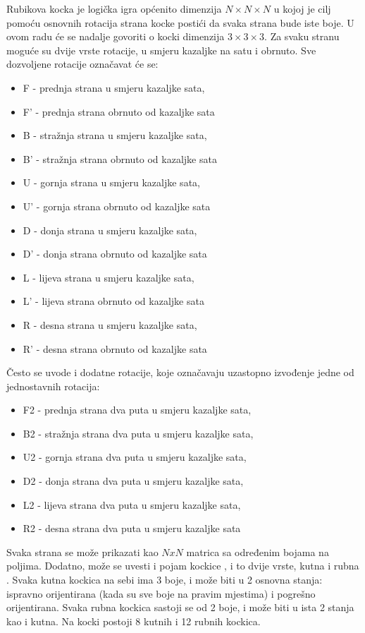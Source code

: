 \documentclass[times, utf8, seminar, numeric]{fer}
\begin{document}
Rubikova kocka je logička igra općenito dimenzija $N\times N\times N$ u kojoj je cilj pomoću osnovnih rotacija strana kocke postići da svaka strana bude iste boje. U ovom radu će se nadalje govoriti o kocki dimenzija $3\times3\times3$. Za svaku stranu moguće su dvije vrste rotacije, u smjeru kazaljke na satu i obrnuto. Sve dozvoljene rotacije označavat će se:

\begin{itemize}
\item F - prednja strana u smjeru kazaljke sata, 
\item F' - prednja strana obrnuto od kazaljke sata
\item B - stražnja strana u smjeru kazaljke sata, 
\item B' - stražnja strana obrnuto od kazaljke sata
\item U - gornja strana u smjeru kazaljke sata, 
\item U' - gornja strana obrnuto od kazaljke sata
\item D - donja strana u smjeru kazaljke sata, 
\item D' - donja strana obrnuto od kazaljke sata
\item L - lijeva strana u smjeru kazaljke sata, 
\item L' - lijeva strana obrnuto od kazaljke sata
\item R - desna strana u smjeru kazaljke sata, 
\item R' - desna strana obrnuto od kazaljke sata
\end{itemize}

Često se uvode i dodatne rotacije, koje označavaju uzastopno izvođenje jedne od jednostavnih rotacija:
\begin{itemize}
\item F2 - prednja strana dva puta u smjeru kazaljke sata, 
\item B2 - stražnja strana dva puta u smjeru kazaljke sata, 
\item U2 - gornja strana dva puta u smjeru kazaljke sata, 
\item D2 - donja strana dva puta u smjeru kazaljke sata, 
\item L2 - lijeva strana dva puta u smjeru kazaljke sata, 
\item R2 - desna strana dva puta u smjeru kazaljke sata
\end{itemize}

Svaka strana se može prikazati kao $NxN$ matrica sa određenim bojama na poljima. Dodatno, može se uvesti i pojam kockice , i to dvije vrste, kutna  i rubna . Svaka kutna kockica na sebi ima 3 boje, i može biti u 2 osnovna stanja: ispravno orijentirana (kada su sve boje na pravim mjestima) i pogrešno orijentirana. Svaka rubna kockica sastoji se od 2 boje, i može biti u ista 2 stanja kao i kutna. 
Na kocki postoji 8 kutnih i 12 rubnih kockica.
\end{document}
